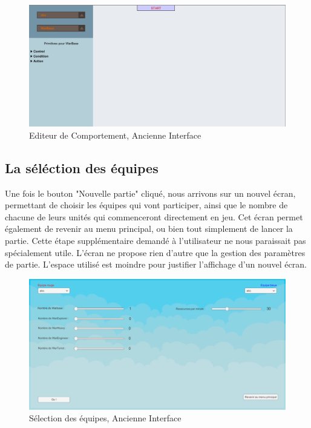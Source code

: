 \documentclass{report}
\begin{document}
\begin{enumerate}
\begin{figure}[h]
	\centering
		\includegraphics[scale=0.50]{BehaviorScreenOld}
	\caption{Editeur de Comportement, Ancienne Interface}
\end{figure}

\end{enumerate}


\subsection{La séléction des équipes}
Une fois le bouton "Nouvelle partie" cliqué, nous arrivons sur un nouvel écran, permettant de choisir les équipes qui vont participer, ainsi que le nombre de chacune de leurs unités qui commenceront directement en jeu.\newline
Cet écran permet également de revenir au menu principal, ou bien tout simplement de lancer la partie. Cette étape supplémentaire demandé à l'utilisateur ne nous paraissait pas spécialement utile. L'écran ne propose rien d'autre que la gestion des paramètres de partie. L'espace utilisé est moindre pour justifier l'affichage d'un nouvel écran.

\begin{figure}[!h]
	\centering
		\includegraphics[scale=0.50]{SettingsOld}
	\caption{Sélection des équipes, Ancienne Interface}
\end{figure}
\end{document}
